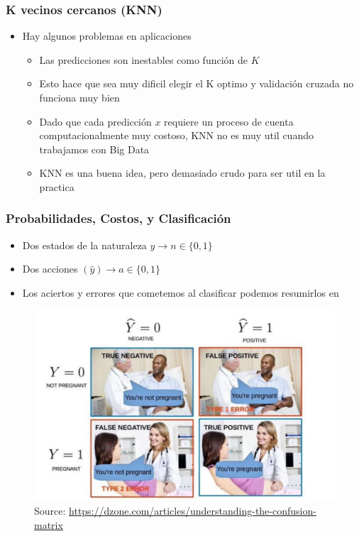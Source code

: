 \documentclass[
  shownotes,
  xcolor={svgnames},
  hyperref={colorlinks,citecolor=DarkBlue,linkcolor=DarkRed,urlcolor=DarkBlue}
  , aspectratio=169]{beamer}
\begin{document}
\begin{frame}[fragile]
\frametitle{K vecinos cercanos (KNN)}
\begin{itemize}

  \item Hay algunos problemas en aplicaciones
  \medskip
  \begin{itemize}
  \item Las predicciones son inestables como función de $K$
  \medskip
  \item Esto hace que sea muy dificil elegir el K optimo y validación cruzada no funciona muy bien
  \medskip
  \item Dado que cada predicción  $x$ requiere un proceso de cuenta computacionalmente muy costoso, KNN no es muy util cuando trabajamos con Big Data
  \medskip
  \item KNN es una buena idea, pero demasiado crudo para ser util en la practica
  \end{itemize}
\end{itemize}

\end{frame}


\begin{frame}[fragile]
\frametitle{Probabilidades, Costos, y Clasificación}
\pause
\begin{itemize}
  \item Dos estados de la naturaleza $y \rightarrow n\in\{0,1\}$
  \medskip
  \item Dos acciones $(\hat{y}) \rightarrow a\in \{0,1\}$
  \medskip
  \item Los aciertos y errores que cometemos al clasificar podemos resumirlos en
\end{itemize}
        \begin{figure}[H] \centering
            \captionsetup{justification=centering}
              \includegraphics[scale=0.3]{figures/confusion_matrix}
              \\
              \tiny
              Source: \url{https://dzone.com/articles/understanding-the-confusion-matrix}
 \end{figure}


 \end{frame}
\end{document}
